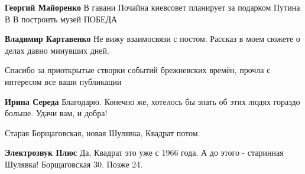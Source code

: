 \begin{itemize}
\begin{itemize}
\textbf{Георгий Майоренко} В гавани Почайна киевсовет планирует за подарком Путина В В построить музей ПОБЕДА

\textbf{Владимир Картавенко} Не вижу взаимосвязи с постом. Рассказ в моем сюжете о делах давно минувших дней.
\end{itemize} %


Спасибо за приоткрытые створки событий брежневских времён, прочла с интересом
все ваши публикации

\begin{itemize} %
\textbf{Ирина Середа} Благодарю. Конечно же, хотелось бы знать об этих людях гораздо больше. Удачи вам, и добра!
\end{itemize} %

Старая Борщаговская, новая Шулявка, Квадрат потом.

\begin{itemize} %
\textbf{Электрозвук Плюс} Да, Квадрат это уже с 1966 года. А до этого - старинная Шулявка! Борщаговская 30. Позже 24.
\end{itemize} %

\end{itemize} %

